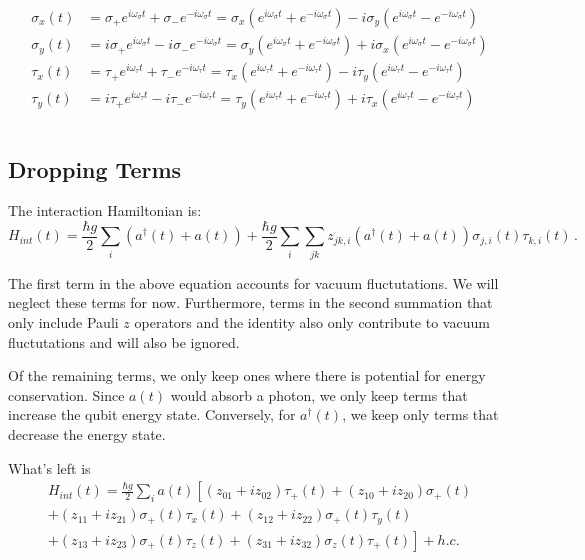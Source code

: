 \documentclass[
    preprint,
    amsmath,amssymb,
    aps,
    prb,
    floatfix,
]{revtex4-2}
\begin{document}
    \begin{align*}
        \sigma_x(t) &= \sigma_+e^{i\omega_\sigma t} + \sigma_-e^{-i\omega_\sigma t} = \sigma_x(e^{i\omega_\sigma t}+e^{-i\omega_\sigma t})-i\sigma_y(e^{i\omega_\sigma t}-e^{-i\omega_\sigma t}) \\
        \sigma_y(t) &= i\sigma_+e^{i\omega_\sigma t} -i \sigma_-e^{-i\omega_\sigma t} = \sigma_y(e^{i\omega_\sigma t}+e^{-i\omega_\sigma t})+i\sigma_x(e^{i\omega_\sigma t}-e^{-i\omega_\sigma t})  \\
        \tau_x(t) &= \tau_+e^{i\omega_\tau t} + \tau_-e^{-i\omega_\tau t} = \tau_x(e^{i\omega_\tau t}+e^{-i\omega_\tau t})-i\tau_y(e^{i\omega_\tau t}-e^{-i\omega_\tau t})\\
        \tau_y(t) &= i\tau_+e^{i\omega_\tau t} -i \tau_-e^{-i\omega_\tau t}= \tau_y(e^{i\omega_\tau t}+e^{-i\omega_\tau t})+i\tau_x(e^{i\omega_\tau t}-e^{-i\omega_\tau t})\\ \\
    \end{align*}



    \subsection{Dropping Terms}
    The interaction Hamiltonian is:
    \begin{equation}
        H_{int}(t) = \frac{\hbar g}{2}\sum_i (a^\dagger(t)+a(t))+\frac{\hbar g}{2}\sum_i\sum_{jk}z_{jk,i}(a^\dagger(t)+a(t))\sigma_{j,i}(t)\tau_{k,i}(t) \,.
        \label{Hint_I}
    \end{equation}

    The first term in the above equation accounts for vacuum fluctutations. We will neglect these terms for now. Furthermore, terms in the second summation that only include Pauli $z$ operators and the identity also only contribute to vacuum fluctutations and will also be ignored.

    Of the remaining terms, we only keep ones where there is potential for energy conservation. Since $a(t)$ would absorb a photon, we only keep terms that increase the qubit energy state. Conversely, for $a^\dagger(t)$, we keep only terms that decrease the energy state.

    What's left is
    \begin{multline}
        H_{int}(t) = \frac{\hbar g}{2}\sum_i a(t)\left[ (z_{01}+iz_{02})\tau_+(t) + (z_{10}+iz_{20})\sigma_+(t) \right. \\ 
        + (z_{11} + iz_{21})\sigma_+(t)\tau_x(t) +(z_{12}+iz_{22})\sigma_+(t)\tau_y(t) \\
        \left. +(z_{13}+iz_{23})\sigma_+(t)\tau_z(t) + (z_{31}+iz_{32})\sigma_z(t)\tau_+(t) \right] + h.c.
    \end{multline}
\end{document}
